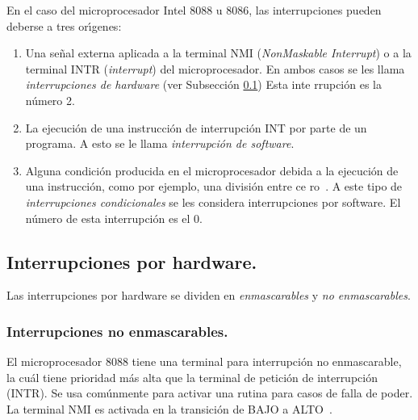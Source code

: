 En el caso del microprocesador Intel 8088 u 8086, las interrupciones pueden deberse a tres %
or\'{\i}genes:

\begin{enumerate}
\item Una se\~nal externa aplicada a la terminal NMI ({\em NonMaskable Interrupt\/}) o a la %
terminal INTR ({\em interrupt\/}) del microprocesador. En ambos casos se les llama {\em %
interrupciones de hardware\/} (ver Subsecci\'on \ref{Subsection:hardint}) Esta in\-te\-%
rrup\-ci\-\'on es la n\'umero 2.

\item La ejecuci\'on de una instrucci\'on de in\-te\-rrup\-ci\-\'on INT por parte de un %
programa. A esto se le llama {\em in\-te\-rrup\-ci\-\'on de software\/}.

\item Alguna condici\'on producida en el microprocesador debida a la e\-je\-cu\-ci\-\'on de %
una ins\-truc\-ci\-\'on, co\-mo por e\-jem\-plo, u\-na di\-vi\-si\-\'on en\-tre ce\-%
ro~\cite{Hall}. A este tipo de {\em interrupciones condicionales\/} se les considera %
interrupciones por software. El n\'umero de esta in\-te\-rrup\-ci\-\'on es el 0.
\end{enumerate} 


\subsection{Interrupciones por hardware.}
\label{Subsection:hardint}

Las interrupciones por hardware se dividen en {\em enmascarables\/} y {\em no %
enmascarables\/}.


\subsubsection{Interrupciones no enmascarables.}
\label{Subsubsection:NMI}

El microprocesador 8088 tiene una terminal para in\-te\-rrup\-ci\-\'on no enmascarable, la %
cu\'al tiene prioridad m\'as alta que la terminal de petici\'on de in\-te\-rrup\-ci\-\'on %
(INTR). Se usa com\'unmente para activar una rutina para casos de falla de poder. La terminal %
NMI es activada en la transici\'on de BAJO a ALTO~\cite{Intel:Micro}.

